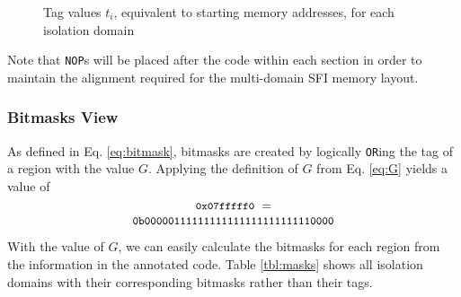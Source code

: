 \documentclass[12pt]{IEEEtran}
\begin{document}
\begin{figure*}[b]
\begin{drawstack}[scale=0.75]
	\footnotesize
	\startframe
		 
	\startframe
		 
	\startframe
		 
	\startframe
		 
	\startframe
		 
\end{drawstack}
\caption{Tag values $t_i$, equivalent to starting memory addresses, for each isolation domain} \label{domains_mem}
\end{figure*}

Note that \texttt{NOP}s will be placed after the code within each section in order to maintain the alignment required for the multi-domain SFI memory layout.

\subsubsection{Bitmasks View}

As defined in Eq.  \ref{eq:bitmask}, bitmasks are created by logically \texttt{OR}ing the tag of a region with the value $G$. Applying the definition of $G$ from Eq. \ref{eq:G} yields a value of
$$ \small{\texttt{0x07fffff0}\ =}$$
$$ \small{\texttt{0b00000111111111111111111111110000}} $$

With the value of $G$, we can easily calculate the bitmasks for each region from the information in the annotated code. Table \ref{tbl:masks} shows all isolation domains with their corresponding bitmasks rather than their tags.
\end{document}
